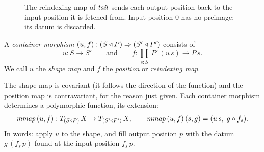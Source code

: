 \documentclass{fundam}
\begin{document}
\begin{figure}[t]
  \centering
  \caption{The reindexing map of $\mathit{tail}$ sends each output position back to the input
    position it is fetched from.  Input position $0$ has no preimage: its datum is
    discarded.}\label{fig:tail}
\end{figure}

\begin{definition}\label{def:cmor}
  A \emph{container morphism} $(u, f) : (S \triangleleft P) \Rightarrow (S' \triangleleft P')$ consists of
  \[
    u : S \to S' \qquad\text{and}\qquad f : \textstyle\prod_{s:S}\, P'\,(u\,s) \to P\,s .
  \]
  We call $u$ the \emph{shape map} and $f$ the \emph{position} or \emph{reindexing map}.
\end{definition}

The shape map is covariant (it follows the direction of the function) and the position map
is contravariant, for the reason just given.  Each container morphism determines a
polymorphic function, its extension:
\begin{equation}\label{eq:mmap}
  \mathit{mmap}\,(u,f) : T_{(S \triangleleft P)}\,X \to T_{(S' \triangleleft P')}\,X, \qquad
  \mathit{mmap}\,(u,f)\,(s, g) = (u\,s,\; g \circ f_s).
\end{equation}
In words: apply $u$ to the shape, and fill output position $p$ with the datum
$g\,(f_s\,p)$ found at the input position $f_s\,p$.
\end{document}
